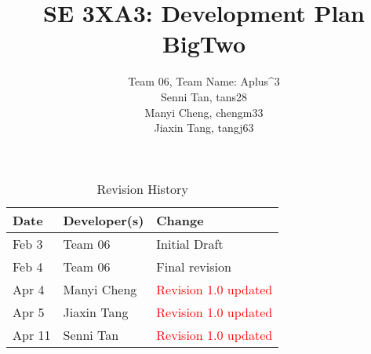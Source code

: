 \documentclass{article}
\title{SE 3XA3: Development Plan\\BigTwo}
\author{Team 06, Team Name: Aplus^3
		\\ Senni Tan, tans28
		\\ Manyi Cheng, chengm33
		\\ Jiaxin Tang, tangj63
}
\date{}
\begin{document}
\maketitle

\newpage

\begin{table}[hp]
\caption{Revision History} \label{TblRevisionHistory}
\begin{tabularx}{\textwidth}{llX}
\toprule
\textbf{Date} & \textbf{Developer(s)} & \textbf{Change}\\
\midrule
Feb 3 & Team 06 & Initial Draft\\
Feb 4 & Team 06 & Final revision\\
Apr 4 & Manyi Cheng & \textcolor{red}{Revision 1.0 updated}\\
Apr 5 & Jiaxin Tang & \textcolor{red}{Revision 1.0 updated}\\
Apr 11 & Senni Tan & \textcolor{red}{Revision 1.0 updated}\\

\bottomrule
\end{tabularx}
\end{table}
\end{document}
